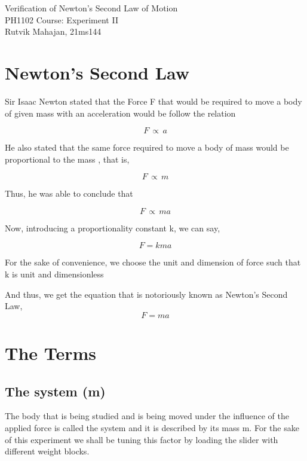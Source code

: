 \documentclass[12pt, letterpaper]{article}
\begin{document}
\begin{center}
    \huge{Verification of Newton's Second Law of Motion} \\[20pt]
    \large{PH1102 Course: Experiment II} \\[10pt]
    \large{Rutvik Mahajan, 21ms144}
\end{center}

\vspace{5cm}

\hrulefill
 
\section{Newton's Second Law}
Sir Isaac Newton stated that the Force F that would be required to move a body of given mass with an acceleration  would be follow the relation 

\begin{equation}
    F\,\propto\,a   
\end{equation}

He also stated that the same force required to move a body of mass  would be proportional to the mass , that is,

\begin{equation}
    F\,\propto\,m
\end{equation}

Thus, he was able to conclude that 

   \[ F\,\propto\,ma\]

Now, introducing a proportionality constant k, we can say, 

\begin{equation}
    F = kma
\end{equation}

For the sake of convenience, we choose the unit and dimension of force such that k is unit and dimensionless

And thus, we get the equation that is notoriously known as Newton's Second Law, 
\begin{equation}
    F = ma 
\end{equation}

\section{The Terms}
\subsection{The system (m)}
The body that is being studied and is being moved under the influence of the applied force is called the system and it is described by its mass m.
For the sake of this experiment we shall be tuning this factor by loading the slider with different weight blocks.
\end{document}
